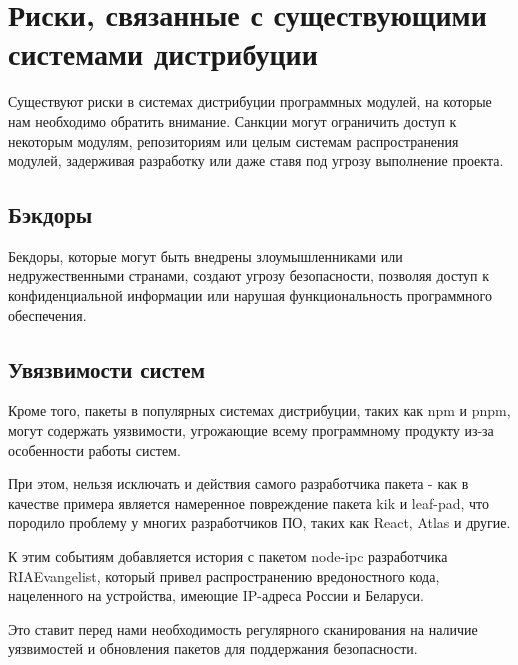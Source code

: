 \section{Риски, связанные с существующими системами дистрибуции}

Существуют риски в системах дистрибуции программных модулей, на которые нам необходимо обратить внимание. Санкции могут ограничить доступ к некоторым модулям, репозиториям или целым системам распространения модулей, задерживая разработку или даже ставя под угрозу выполнение проекта.

\subsection{Бэкдоры}


Бекдоры, которые могут быть внедрены злоумышленниками или недружественными странами, создают угрозу безопасности, позволяя доступ к конфиденциальной информации или нарушая функциональность программного обеспечения.

\subsection{Увязвимости систем}

Кроме того, пакеты в популярных системах дистрибуции, таких как npm и pnpm, могут содержать уязвимости, угрожающие всему программному продукту из-за особенности работы систем. 

При этом, нельзя исключать и действия самого разработчика пакета - как в качестве примера является намеренное повреждение пакета kik и leaf-pad, что породило проблему у многих разработчиков ПО, таких как React, Atlas и другие. \cite{risk:remove-packages}

К этим событиям добавляется история с пакетом node-ipc разработчика RIAEvangelist, который привел распространению вредоностного кода, нацеленного на устройства, имеющие IP-адреса России и Беларуси. \cite{risk:node-npc} \cite{risk:node-npc-2}

Это ставит перед нами необходимость регулярного сканирования на наличие уязвимостей и обновления пакетов для поддержания безопасности.

